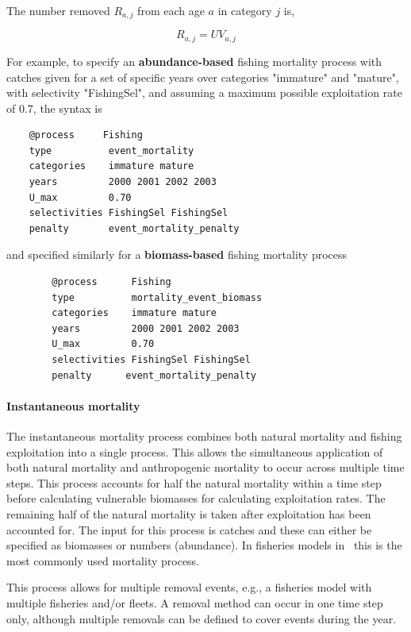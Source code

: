 The number removed $R_{a,j}$ from each age $a$ in category $j$ is,

\begin{equation}
  R_{a,j} = U V_{a,j}
\end{equation}

For example, to specify an \textbf{abundance-based} fishing mortality process with catches given for a set of specific years over categories "immature" and "mature", with selectivity "FishingSel", and assuming a maximum possible exploitation rate of 0.7, the syntax is

{\small{\begin{verbatim}
	@process     Fishing
	type          event_mortality
	categories    immature mature
	years         2000 2001 2002 2003
	U_max         0.70
	selectivities FishingSel FishingSel
	penalty       event_mortality_penalty
	\end{verbatim}}}

and specified similarly for a \textbf{biomass-based} fishing mortality process

{\small{\begin{verbatim}
		@process      Fishing
		type          mortality_event_biomass
		categories    immature mature
		years         2000 2001 2002 2003
		U_max         0.70
		selectivities FishingSel FishingSel
		penalty      event_mortality_penalty
		\end{verbatim}}}

\paragraph{Instantaneous mortality}\label{sec:Process-MortalityInstantaneous}

The instantaneous mortality process combines both natural mortality and fishing exploitation into a single process. This allows the simultaneous application of both natural mortality and anthropogenic mortality to occur across multiple time steps. This process accounts for half the natural mortality within a time step before calculating vulnerable biomasses for calculating exploitation rates. The remaining half of the natural mortality is taken after exploitation has been accounted for. The input for this process is catches and these can either be specified as biomasses or numbers (abundance). In fisheries models in \CNAME\ this is the most commonly used mortality process.

This process allows for multiple removal events, e.g., a fisheries model with multiple fisheries and/or fleets. A removal method can occur in one time step only, although multiple removals can be defined to cover events during the year.


